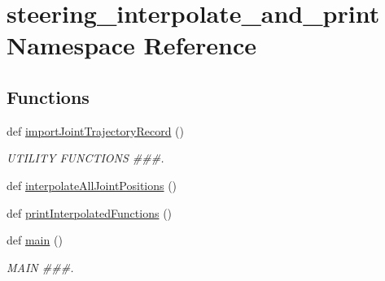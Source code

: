 \hypertarget{namespacesteering__interpolate__and__print}{}\section{steering\+\_\+interpolate\+\_\+and\+\_\+print Namespace Reference}
\label{namespacesteering__interpolate__and__print}
\subsection*{Functions}
\begin{DoxyCompactItemize}
\item 
def \mbox{\hyperlink{namespacesteering__interpolate__and__print_a6222ad19f86d4f86d29313c773212a98}{import\+Joint\+Trajectory\+Record}} ()
\begin{DoxyCompactList}\small\item\em U\+T\+I\+L\+I\+TY F\+U\+N\+C\+T\+I\+O\+NS \#\#\#. \end{DoxyCompactList}\item 
def \mbox{\hyperlink{namespacesteering__interpolate__and__print_ae7e7cca01e99c10286aea890f5aaa0ef}{interpolate\+All\+Joint\+Positions}} ()
\item 
def \mbox{\hyperlink{namespacesteering__interpolate__and__print_a43ddc2f8fb0425e973a504a5d38289c2}{print\+Interpolated\+Functions}} ()
\item 
def \mbox{\hyperlink{namespacesteering__interpolate__and__print_aa2a632b8d620697929911569ba53daf3}{main}} ()
\begin{DoxyCompactList}\small\item\em M\+A\+IN \#\#\#. \end{DoxyCompactList}\end{DoxyCompactItemize}

